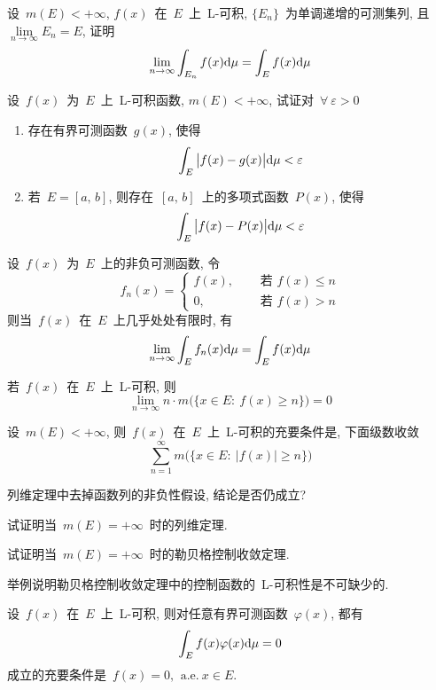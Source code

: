 \begin{problemset}
\item 设~$m(E) < +\infty$, $f(x)$~在~$E$~上~L-可积, $\{E_n\}$~为单调递增的可测集列, 且~$\lim\limits_{n \to \infty} E_n = E$, 证明
    \[
    \lim_{n \to \infty} \int_{E_n} f(x) \mathrm{d} \mu = \int_E f(x) \mathrm{d} \mu
    \]

\item 设~$f(x)$~为~$E$~上~L-可积函数, $m(E) < +\infty$, 试证对~$\forall~\varepsilon >0$
\begin{enumerate}
  \item 存在有界可测函数~$g(x)$, 使得
  \[
  \int_E \big| f(x)-g(x) \big| \mathrm{d} \mu < \varepsilon
  \]
  \item 若~$E = [a,\,  b]$, 则存在~$[a,\,  b]$~上的多项式函数~$P(x)$, 使得
  \[
  \int_E \big| f(x)-P(x) \big| \mathrm{d} \mu < \varepsilon
  \]
\end{enumerate}

\item 设~$f(x)$~为~$E$~上的非负可测函数, 令
\[
f_n(x) = \left\{ \!\!
\begin{array}{cl}
f(x), \quad &\mbox{~若~} f(x) \leqslant n  \\[0.2cm]
0,  \quad &\mbox{~若~} f(x) > n
\end{array}
\right.
\]
则当~$f(x)$~在~$E$~上几乎处处有限时, 有
\[
\lim_{n \to \infty} \int_E f_n(x) \mathrm{d} \mu = \int_E f(x) \mathrm{d} \mu
\]

\item 若~$f(x)$~在~$E$~上~L-可积, 则
\[
\lim_{n \to \infty} n \cdot m \big( \{ x \in E: \: f(x) \geqslant n\} \big) = 0
\]

\item 设~$m(E) < +\infty$, 则~$f(x)$~在~$E$~上~L-可积的充要条件是, 下面级数收敛
\[
\sum_{n=1}^\infty m\big( \{x \in E:\: |f(x)| \geqslant n \} \big)
\]

\item 列维定理中去掉函数列的非负性假设, 结论是否仍成立?

\item 试证明当~$m(E)=+\infty$~时的列维定理.

\item 试证明当~$m(E)=+\infty$~时的勒贝格控制收敛定理.

\item 举例说明勒贝格控制收敛定理中的控制函数的~L-可积性是不可缺少的.

\item 设~$f(x)$~在~$E$~上~L-可积, 则对任意有界可测函数~$\varphi(x)$, 都有
\[
\int_E f(x)\varphi(x) \mathrm{d} \mu = 0
\]
成立的充要条件是~$f(x) = 0,\,  \mathrm{~a.e.~} x \in E$.


\end{problemset}
